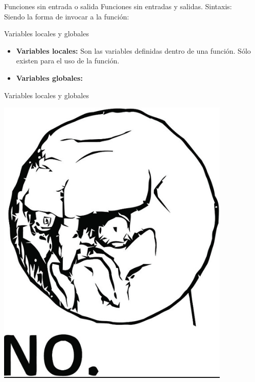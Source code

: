 \documentclass{bredelebeamer}
\begin{document}
\begin{frame}{Funciones sin entrada o salida}
Funciones sin entradas y salidas. Sintaxis:\\

Siendo la forma de invocar a la función:

\end{frame}

\begin{frame}{Variables locales y globales}
\begin{itemize}
\item \textbf{Variables locales:} Son las variables definidas dentro de una función. Sólo existen para el uso de la función.
\item \textbf{Variables globales:} 
\end{itemize}
\end{frame}

\begin{frame}{Variables locales y globales}
\begin{center}
\includegraphics[scale=0.4]{images/img41.png}
\end{center}
\end{frame}
\end{document}
